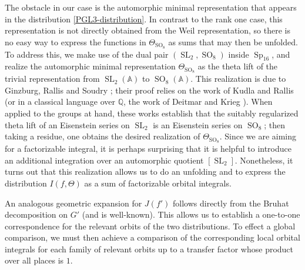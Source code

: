 \documentclass[12pt]{amsart}
\newcommand{\SL}{\operatorname{SL}}
\newcommand{\Sp}{\operatorname{Sp}}
\newcommand{\SO}{\operatorname{SO}}
\newcommand{\A}{\mathbb{A}}
\theoremstyle{remark}
\begin{document}
The obstacle in our case is the automorphic minimal representation that appears in the distribution \eqref{PGL3-distribution}. In contrast to the rank one case, this
representation is not directly obtained from the Weil representation, so there is no easy way to express the functions in $\Theta_{\SO_8}$ as sums that may then be unfolded.
To address this, we make use of the dual pair $(\SL_2,\SO_8)$ inside $\Sp_{16}$, and realize the automorphic minimal representation $\Theta_{\SO_8}$ as the
theta lift of the trivial representation from $\SL_2(\A)$
to $\SO_8(\A)$.  This realization is due to Ginzburg, Rallis and Soudry \cite[Theorem 6.9]{MR1469105}; their proof
relies on the work of Kudla and Rallis \cite{MR1289491} (or in a classical language over $\mathbb{Q}$, the work of Deitmar and Krieg \cite{MR1128710}).
When applied to the groups at hand, these works establish that the suitably regularized theta lift of an Eisenstein series on $\SL_2$ is an Eisenstein series on $\SO_8$;
then taking a residue, one obtains the desired realization of $\Theta_{\SO_8}$. Since we are aiming for a factorizable integral, it is perhaps surprising that
it is helpful to introduce an additional integration over an automorphic quotient $[\SL_2]$.  Nonetheless, it turns out that this
realization allows us to do an unfolding and to express the distribution
$I(f,\Theta)$ as a sum of factorizable orbital integrals.

 An analogous geometric expansion for $J(f')$ follows directly from the Bruhat decomposition on $G'$ 
(and is well-known).  
This allows us to establish a 
one-to-one correspondence for the relevant orbits of the two distributions.  To effect a global comparison, 
we must then achieve a comparison of the corresponding local orbital integrals for each family of relevant orbits up to a transfer factor whose product
over all places is $1$.  
\end{document}
